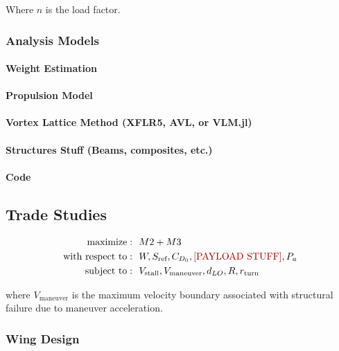 \documentclass[report]{byu-aero}
\begin{document}
Where \(n\) is the load factor.

\subsubsection{Analysis Models}


\paragraph{Weight Estimation}


\paragraph{Propulsion Model}


\paragraph{Vortex Lattice Method (XFLR5, AVL, or VLM.jl)}


\paragraph{Structures Stuff (Beams, composites, etc.)}


\paragraph{Code}




\subsection{Trade Studies}
\label{ssec:tradestudies}

\begin{equation}
	\label{eqn:optdef}
	\begin{aligned}
		\text{maximize}: 
		& ~~M2 + M3 \\
		\text{with respect to}:
		& ~~W, S_\text{ref}, C_{D_0}, \text{\color{\BYUred} [PAYLOAD STUFF]}, P_a \\
		\text{subject to}: 
		& ~~V_\text{stall}, V_\text{maneuver}, d_{LO}, R, r_\text{turn}
	\end{aligned}
\end{equation}

where \(V_\text{maneuver}\) is the maximum velocity boundary associated with structural failure due to maneuver acceleration.


\subsubsection{Wing Design}
\end{document}

